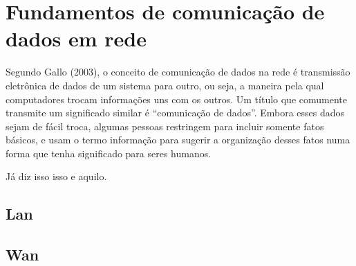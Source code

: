\section{Fundamentos de comunicação de dados em rede}
Segundo \nocite{gallo2003comunicaccao}Gallo (2003), o conceito de comunicação de dados na rede é transmissão eletrônica de dados
de um sistema para outro, ou seja, a maneira pela qual computadores trocam informações
uns com os outros. Um título que comumente transmite um significado similar é
“comunicação de dados”. Embora esses dados sejam de fácil troca, algumas pessoas restringem
para incluir somente fatos básicos, e usam o termo informação para sugerir a
organização desses fatos numa forma que tenha significado para seres humanos.

Já \citet{forouzan2009comunicaccao} diz isso isso e aquilo.

\lipsum[1]

	\subsection{Lan}
	\lipsum[1]
	
	\subsection{Wan}
	\lipsum[1]